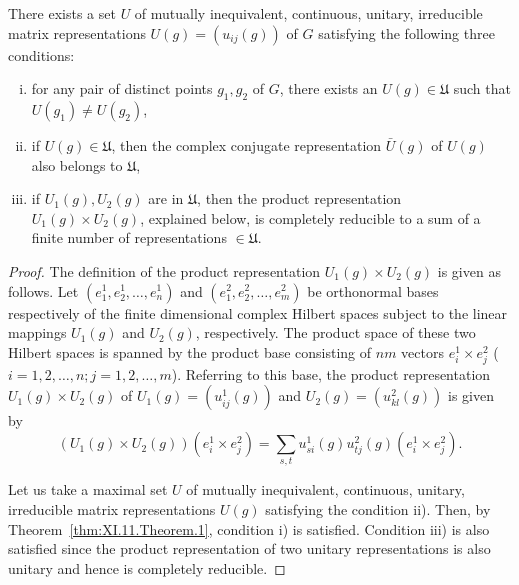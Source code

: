 \begin{corollaryu} There exists a set $U$ of mutually inequivalent, continuous, unitary, irreducible matrix representations $U(g) = (u_{ij}(g))$ of $G$ satisfying the following three conditions: 

\begin{enumerate}[i)]
\item for any pair of distinct points $g_1, g_2$ of $G$, there exists an $U(g) \in \mathfrak{U}$ such that $U(g_1) \neq U(g_2)$,
\item if $U(g) \in \mathfrak{U}$, then the complex conjugate representation $\bar{U}(g)$ of $U(g)$ also belongs to $\mathfrak{U}$,
\item if $U_{1}(g), U_{2}(g)$ are in $\mathfrak{U}$, then the product representation $U_{1}(g) \times U_{2}(g)$, explained below, is completely reducible to a sum of a finite number of representations $\in \mathfrak{U}$.
\end{enumerate}
\end{corollaryu}

\begin{proof}
 The definition of the product representation $U_{1}(g) \times U_{2}(g)$ is given as follows. Let $(e_{1}^{1}, e_{2}^{1}, \ldots, e_{n}^{1})$ and $(e_{1}^{2}, e_{2}^{2}, \ldots, e_{m}^{2})$ be orthonormal bases respectively of the finite dimensional complex Hilbert spaces subject to the linear mappings $U_{1}(g)$ and $U_{2}(g)$, respectively. The product space of these two Hilbert spaces is spanned by the product base consisting of $nm$ vectors $e_i^1 \times e_j^2$ ( $i = 1, 2, \ldots, n; j = 1, 2, \ldots, m$). Referring to this base, the product representation $U_1(g) \times U_2(g)$ of $U_1(g) = (u_{ij}^1(g))$ and $U_2(g) = (u_{kl}^2(g))$ is given by 
\[
\left(U _{1} (g) \times U _{2} (g)\right) \left(e _{i} ^{1} \times e _{j} ^{2}\right) = \sum\limits_{s,t} u _{si} ^{1} (g) u _{tj} ^{2} (g) \left(e _{i} ^{1} \times e _{j} ^{2}\right). \]

Let us take a maximal set $U$ of mutually inequivalent, continuous, unitary, irreducible matrix representations $U(g)$ satisfying the condition ii). Then, by Theorem~\ref{thm:XI.11.Theorem.1}, condition i) is satisfied. Condition iii) is also satisfied since the product representation of two unitary representations is also unitary and hence is completely reducible. 
\end{proof}


